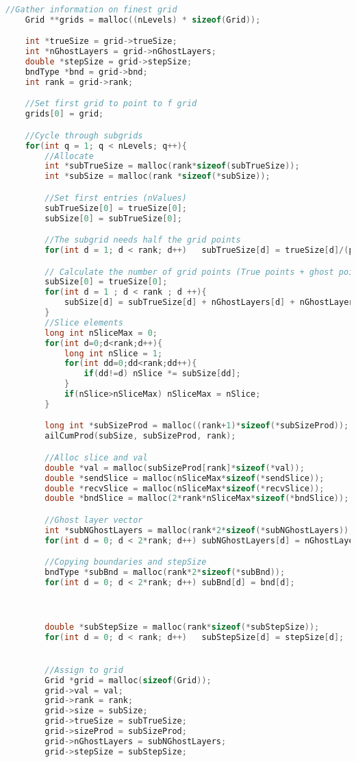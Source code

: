 \begin{lstlisting}[language=c, caption = main routine]
	//Gather information on finest grid
	Grid **grids = malloc((nLevels) * sizeof(Grid));

	int *trueSize = grid->trueSize;
	int *nGhostLayers = grid->nGhostLayers;
	double *stepSize = grid->stepSize;
	bndType *bnd = grid->bnd;
	int rank = grid->rank;

	//Set first grid to point to f grid
	grids[0] = grid;

	//Cycle through subgrids
	for(int q = 1; q < nLevels; q++){
		//Allocate
		int *subTrueSize = malloc(rank*sizeof(subTrueSize));
		int *subSize = malloc(rank *sizeof(*subSize));

		//Set first entries (nValues)
		subTrueSize[0] = trueSize[0];
		subSize[0] = subTrueSize[0];

		//The subgrid needs half the grid points
		for(int d = 1; d < rank; d++)	subTrueSize[d] = trueSize[d]/(pow(2,q));

		// Calculate the number of grid points (True points + ghost points)
		subSize[0] = trueSize[0];
		for(int d = 1 ; d < rank ; d ++){
			subSize[d] = subTrueSize[d] + nGhostLayers[d] + nGhostLayers[rank + d];
		}
		//Slice elements
		long int nSliceMax = 0;
		for(int d=0;d<rank;d++){
			long int nSlice = 1;
			for(int dd=0;dd<rank;dd++){
				if(dd!=d) nSlice *= subSize[dd];
			}
			if(nSlice>nSliceMax) nSliceMax = nSlice;
		}

		long int *subSizeProd = malloc((rank+1)*sizeof(*subSizeProd));
		ailCumProd(subSize, subSizeProd, rank);

		//Alloc slice and val
		double *val = malloc(subSizeProd[rank]*sizeof(*val));
		double *sendSlice = malloc(nSliceMax*sizeof(*sendSlice));
		double *recvSlice = malloc(nSliceMax*sizeof(*recvSlice));
		double *bndSlice = malloc(2*rank*nSliceMax*sizeof(*bndSlice));

		//Ghost layer vector
		int *subNGhostLayers = malloc(rank*2*sizeof(*subNGhostLayers));
		for(int d = 0; d < 2*rank; d++)	subNGhostLayers[d] = nGhostLayers[d];

		//Copying boundaries and stepSize
		bndType *subBnd = malloc(rank*2*sizeof(*subBnd));
		for(int d = 0; d < 2*rank; d++)	subBnd[d] = bnd[d];



		double *subStepSize = malloc(rank*sizeof(*subStepSize));
		for(int d = 0; d < rank; d++)	subStepSize[d] = stepSize[d];


		//Assign to grid
		Grid *grid = malloc(sizeof(Grid));
		grid->val = val;
		grid->rank = rank;
		grid->size = subSize;
		grid->trueSize = subTrueSize;
		grid->sizeProd = subSizeProd;
		grid->nGhostLayers = subNGhostLayers;
		grid->stepSize = subStepSize;


\end{lstlisting}
